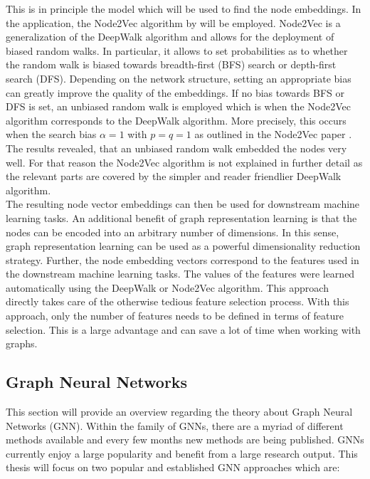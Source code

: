 	\noindent This is in principle the model which will be used to find the node
	embeddings. In the application, the Node2Vec algorithm by will be employed. 
	Node2Vec is a generalization of the DeepWalk algorithm and allows for the deployment of
	biased random walks. In particular, it allows to set probabilities as to
	whether the random walk is biased towards breadth-first (BFS) search or
	depth-first search (DFS). Depending on the network structure, setting an
	appropriate bias can greatly improve the quality of the embeddings. If no
	bias towards BFS or DFS is set, an unbiased random walk is employed which is when
	the Node2Vec algorithm corresponds to the DeepWalk algorithm. More
	precisely, this occurs when the search bias $\alpha = 1$ with $p=q=1$ as
	outlined in the Node2Vec paper \citep[p. 860]{grover2016node2vec}. The results
	revealed, that an unbiased random walk embedded the nodes very well. For
	that reason the Node2Vec algorithm is not explained in further detail as
	the relevant parts are covered by the simpler and reader friendlier 
	DeepWalk algorithm. \\

	\noindent The resulting node vector embeddings can then be used for downstream
	machine learning tasks. An additional benefit of graph representation
	learning is that the nodes can be encoded into an arbitrary number of
	dimensions. In this sense, graph representation learning can be used as a
	powerful dimensionality reduction strategy. Further, the node embedding vectors
	correspond to the features used in the downstream machine learning tasks.
	The values of the features were learned automatically using the DeepWalk or
	Node2Vec algorithm. This approach directly takes care of the otherwise
	tedious feature selection process. With this approach, only the number of
	features needs to be defined in terms of feature selection. This is a large
	advantage and can save a lot of time when working with graphs. 

	\subsection{Graph Neural Networks}

	This section will provide an overview regarding the theory about Graph
	Neural Networks (GNN). Within the family of GNNs, there are a myriad of
	different methods available and every few months new methods are being
	published. GNNs currently enjoy a large popularity and benefit from a large
	research output. This thesis will focus on two popular and established GNN
	approaches which are:

